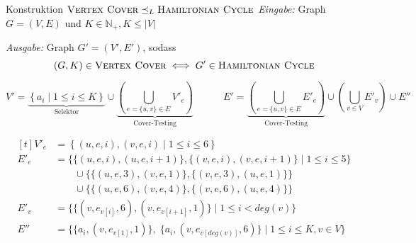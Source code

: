 \documentclass[a4paper,14pt]{scrartcl}
\newcommand{\VC}{\textsc{Vertex Cover}}
\newcommand{\HC}{\textsc{Hamiltonian Cycle}}
\begin{document}
\begin{example}{Konstruktion $\VC \preceq_L \HC$}
    \emph{Eingabe:} Graph $G = (V,E)$ und $K \in \mathbb{N}_+, K \leq |V|$

    \emph{Ausgabe:} Graph $G' = (V',E')$,
    sodass
    \[
        (G,K) \in \VC \iff G' \in \HC
    \]

    \[
        V' =  \underbrace{
                \left\{ a_i \mid 1 \leq i \leq K \right\} 
            }_{\text{Selektor}}
            \cup \underbrace{
                \left( \bigcup_{e = \{ u,v \} \in E} V'_e \right)
            }_{\text{Cover-Testing}}
        \qquad \quad
        E' = \underbrace{
                \left( \bigcup_{e = \{ u,v \} \in E} E'_e \right)
            }_{\text{Cover-Testing}}
            \cup \left( \bigcup_{v \in V} E'_v \right) \cup E''
    \]

    \[
        \begin{aligned}[t]
            V'_e &= \left\{ (u,e,i), (v,e,i) \mid 1 \leq i \leq 6 \right\}  \\
            E'_e &= \Big\{ \{ (u,e,i), (u,e,i+1) \}, \{ (v,e,i), (v,e,i+1) \} \mid 1 \leq i \leq 5 \Big\}  \\
                 &\qquad \cup \Big\{ \{ (u,e,3), (v,e,1) \}, \{ (v,e,3), (u,e,1) \} \Big\}  \\
                 &\qquad \cup \Big\{ \{ (u,e,6), (v,e,4) \}, \{ (v,e,6), (u,e,4) \} \Big\}  \\
            E'_v &= \Big\{ \{ (v,e_{v[i]},6), (v,e_{v[i+1]},1) \} \mid 1 \leq i < deg(v) \Big\}  \\
            E'' &= \Big\{ \{ a_i, (v,e_{v[1]},1) \}, \; \{ a_i, (v, e_{v[deg(v)]},6) \} \mid 1 \leq i \leq K, v \in V \Big\}
        \end{aligned}
    \]
\end{example}
\end{document}
